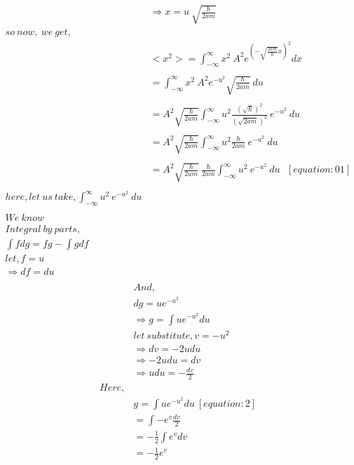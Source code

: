 \documentclass{article}
\begin{document}
\begin{homeworkProblem}
\begin{align*}
  &\Rightarrow x = u \ {\sqrt{\frac{\hbar}{2am}}}\\
  so\ now,\ we \ get,\\
  &<x^{2}>= \int_{-\infty}^{\infty}x^{2}\ A^{2} e^{(-{\sqrt{\frac{2am}{\hbar}}}x)}^{2} dx \\\\
  &= \int_{-\infty}^{\infty}x^{2}\ A^{2} e^{-u^{2}} {\sqrt{\frac{\hbar}{2am}}} \ du  \\\\
  &=  A^{2}{\sqrt{\frac{\hbar}{2am}}} \int_{-\infty}^{\infty}{u^{2}{\frac{(\sqrt{\hbar})^{2}}{(\sqrt{2am})^{2}}}}\ e^{-u^{2}} \ du  \\\\
  &=  A^{2}{\sqrt{\frac{\hbar}{2am}}} \int_{-\infty}^{\infty}{u^{2}{\frac{\hbar}{2am}}}\ e^{-u^{2}} \ du  \\\\ 
  &=  A^{2}{\sqrt{\frac{\hbar}{2am}}}\ {\frac{\hbar}{2am}} \int_{-\infty}^{\infty}u^{2}\ e^{-u^{2}} \ du \ \ \ [equation :01] \\\\
  here,let\ us\ take,
  \int_{-\infty}^{\infty}u^{2}\ e^{-u^{2}} \ du\\\\
  We\ know\\
  Integral\ by\ parts,\\
  \int f dg = fg - \int gdf\\
  let, f = u\\
  \Rightarrow df = du\\
\end{align*}
\newpage\vspace{5mm}
\hspace{20mm}
\large
\begin{align*}
  &And,\\
  &dg = u e^{-u{^2}}\\
  &\Rightarrow g = \int u e^{-u^{2}} du\\
  &let \ substitute, v = -u^{2}\\
  &\Rightarrow dv = -2udu\\
  &\Rightarrow -2u du = dv\\
  &\Rightarrow u du =-\frac{dv}{2}\\
  Here,\\
  &g = \int u e^{-u^{2}} du\ [equation:2]\\
  &=\int- e^{v} \frac{dv}{2} \\
  &=-\frac{1}{2}\int e^{v} dv\\
  &=-\frac{1}{2} e^v \\

\end{align*}
\end{homeworkProblem}
\end{document}

